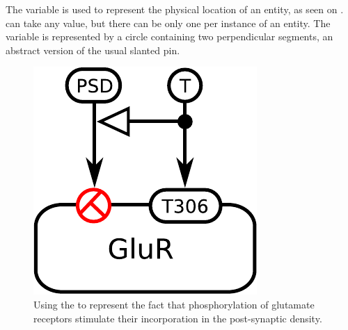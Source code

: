 The variable  is used to represent the physical location of an entity, as seen on \label{sec:location}.  can take any value, but there can be only one  per instance of an entity. The variable is represented by a circle containing two perpendicular segments, an abstract version of the usual slanted pin.

\begin{figure}[H]
  \centering
  \includegraphics[scale = 0.5]{examples/ex-location-2}
  \caption{Using the   to represent the fact that phosphorylation of glutamate receptors stimulate their incorporation in the post-synaptic density.}
  \label{fig:ex-location}
\end{figure}



